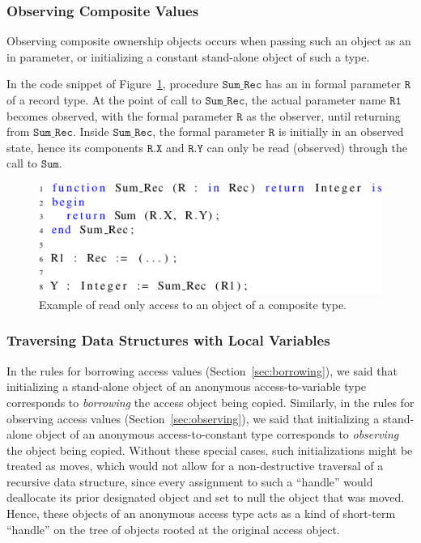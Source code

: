 \documentclass{llncs}
\newcommand\var[1]{\ensuremath{\mathtt{#1}}}
\newcommand{\keyword}[1]{\textsf{#1}}
\begin{document}
\subsubsection{Observing Composite Values}
\label{subsubsec:extendingBorrowing}

Observing composite ownership objects occurs when passing such an object as an \keyword{in} parameter, or initializing a constant stand-alone object of such a type.

In the code snippet of Figure~\ref{fig:observingComposite}, procedure \var{Sum\_Rec} has an \keyword{in} formal parameter \var{R} of a record type.
At the point of call to \var{Sum\_Rec}, the actual parameter name \var{R1} becomes observed, with the formal parameter \var{R} as the observer, until returning from \var{Sum\_Rec}. Inside \var{Sum\_Rec},
the formal parameter \var{R} is initially in an observed state, hence its components \var{R.X} and \var{R.Y} can only be read (observed) through the call to \var{Sum}.


\begin{figure}[htb!]
\centering
  \captionsetup{justification=centering,margin=0.6cm}
   \includegraphics[]{observingComposite}
   \caption{Example of read only access to an object of a composite type.}
   \label{fig:observingComposite}
\end{figure}


\subsubsection{Traversing Data Structures with Local Variables}

In the rules for borrowing access values (Section~\ref{sec:borrowing}), we said that initializing a stand-alone object of an anonymous access-to-variable type corresponds to
\textit{borrowing} the access object being copied. Similarly, in the rules for observing access values (Section~\ref{sec:observing}), we said that initializing a stand-alone object of an
anonymous access-to-constant type corresponds to \textit{observing} the object being copied. Without these special cases, such initializations might be treated as moves, which would not allow for a non-destructive
traversal of a recursive data structure, since every assignment to such a ``handle'' would
deallocate its prior designated object and set to null the object that was moved.  Hence, these objects of an anonymous access type acts as a kind of short-term ``handle'' on the tree of objects rooted at the original access object.
\end{document}
